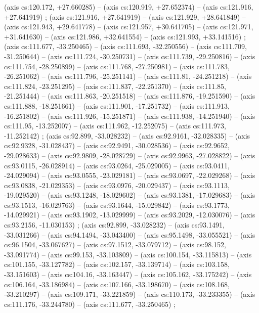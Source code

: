     (axis cs:120.172,    +27.660285) --  (axis cs:120.919,    +27.652374) --  (axis cs:121.916,    +27.641919) ;
    (axis cs:121.916,    +27.641919) --  (axis cs:121.929,    +28.641849) --  (axis cs:121.943,    +29.641778) --  (axis cs:121.957,    +30.641705) --  (axis cs:121.971,    +31.641630) --  (axis cs:121.986,    +32.641554) --  (axis cs:121.993,    +33.141516) ;
    (axis cs:111.677,    -33.250465) --  (axis cs:111.693,    -32.250556) --  (axis cs:111.709,    -31.250644) --  (axis cs:111.724,    -30.250731) --  (axis cs:111.739,    -29.250816) --  (axis cs:111.754,    -28.250899) --  (axis cs:111.768,    -27.250981) --  (axis cs:111.783,    -26.251062) --  (axis cs:111.796,    -25.251141) --  (axis cs:111.81,    -24.251218) --  (axis cs:111.824,    -23.251295) --  (axis cs:111.837,    -22.251370) --  (axis cs:111.85,    -21.251444) --  (axis cs:111.863,    -20.251518) --  (axis cs:111.876,    -19.251590) --  (axis cs:111.888,    -18.251661) --  (axis cs:111.901,    -17.251732) --  (axis cs:111.913,    -16.251802) --  (axis cs:111.926,    -15.251871) --  (axis cs:111.938,    -14.251940) --  (axis cs:111.95,    -13.252007) --  (axis cs:111.962,    -12.252075) --  (axis cs:111.973,    -11.252142) ;
    (axis cs:92.899,    -33.028232) --  (axis cs:92.9161,    -32.028335) --  (axis cs:92.9328,    -31.028437) --  (axis cs:92.9491,    -30.028536) --  (axis cs:92.9652,    -29.028633) --  (axis cs:92.9809,    -28.028729) --  (axis cs:92.9963,    -27.028822) --  (axis cs:93.0115,    -26.028914) --  (axis cs:93.0264,    -25.029005) --  (axis cs:93.0411,    -24.029094) --  (axis cs:93.0555,    -23.029181) --  (axis cs:93.0697,    -22.029268) --  (axis cs:93.0838,    -21.029353) --  (axis cs:93.0976,    -20.029437) --  (axis cs:93.1113,    -19.029520) --  (axis cs:93.1248,    -18.029602) --  (axis cs:93.1381,    -17.029683) --  (axis cs:93.1513,    -16.029763) --  (axis cs:93.1644,    -15.029842) --  (axis cs:93.1773,    -14.029921) --  (axis cs:93.1902,    -13.029999) --  (axis cs:93.2029,    -12.030076) --  (axis cs:93.2156,    -11.030153) ;
    (axis cs:92.899,    -33.028232) --  (axis cs:93.1491,    -33.031266) --  (axis cs:94.1494,    -33.043400) --  (axis cs:95.1498,    -33.055521) --  (axis cs:96.1504,    -33.067627) --  (axis cs:97.1512,    -33.079712) --  (axis cs:98.152,    -33.091774) --  (axis cs:99.153,    -33.103809) --  (axis cs:100.154,    -33.115813) --  (axis cs:101.155,    -33.127782) --  (axis cs:102.157,    -33.139714) --  (axis cs:103.158,    -33.151603) --  (axis cs:104.16,    -33.163447) --  (axis cs:105.162,    -33.175242) --  (axis cs:106.164,    -33.186984) --  (axis cs:107.166,    -33.198670) --  (axis cs:108.168,    -33.210297) --  (axis cs:109.171,    -33.221859) --  (axis cs:110.173,    -33.233355) --  (axis cs:111.176,    -33.244780) --  (axis cs:111.677,    -33.250465) ;
